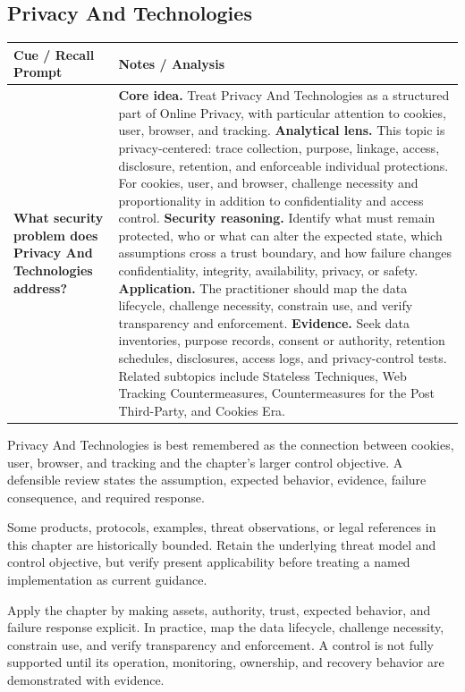\documentclass[11pt]{article}
\newcommand{\CornellHeader}{%
\rowcolor{Navy}\color{white}\bfseries Cue / Recall Prompt & \color{white}\bfseries Notes / Analysis\\\hline}
\newcommand{\CornellRow}[2]{%
\cellcolor{CueGray}\RaggedRight\textbf{#1} & \RaggedRight #2\\\hline}
\begin{document}
\subsection*{Privacy And Technologies}
\begin{longtable}{>{\RaggedRight\arraybackslash}p{}|>{\RaggedRight\arraybackslash}p{}}
\CornellHeader
\CornellRow{What security problem does Privacy And Technologies address?}{\textbf{Core idea.} Treat Privacy And Technologies as a structured part of Online Privacy, with particular attention to cookies, user, browser, and tracking. \textbf{Analytical lens.} This topic is privacy-centered: trace collection, purpose, linkage, access, disclosure, retention, and enforceable individual protections. For cookies, user, and browser, challenge necessity and proportionality in addition to confidentiality and access control. \textbf{Security reasoning.} Identify what must remain protected, who or what can alter the expected state, which assumptions cross a trust boundary, and how failure changes confidentiality, integrity, availability, privacy, or safety. \textbf{Application.} The practitioner should map the data lifecycle, challenge necessity, constrain use, and verify transparency and enforcement. \textbf{Evidence.} Seek data inventories, purpose records, consent or authority, retention schedules, disclosures, access logs, and privacy-control tests. Related subtopics include Stateless Techniques, Web Tracking Countermeasures, Countermeasures for the Post Third-Party, and Cookies Era.}
\end{longtable}
\begin{topicsummary}
Privacy And Technologies is best remembered as the connection between cookies, user, browser, and tracking and the chapter's larger control objective. A defensible review states the assumption, expected behavior, evidence, failure consequence, and required response.
\end{topicsummary}
\begin{historybox}
Some products, protocols, examples, threat observations, or legal references in this chapter are historically bounded. Retain the underlying threat model and control objective, but verify present applicability before treating a named implementation as current guidance.
\end{historybox}
\begin{defensebox}
Apply the chapter by making assets, authority, trust, expected behavior, and failure response explicit. In practice, map the data lifecycle, challenge necessity, constrain use, and verify transparency and enforcement. A control is not fully supported until its operation, monitoring, ownership, and recovery behavior are demonstrated with evidence.
\end{defensebox}
\end{document}

